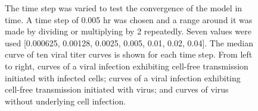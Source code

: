 \begin{figure}
    \centering
    \parbox{\textwidth}{

    \vspace{0.5em}
    \centering
        }


\caption{The time step was varied to test the convergence of the model in time. A time step of 0.005 hr was chosen and a range around it was made by dividing or multiplying by 2 repeatedly. Seven values were used [0.000625, 0.00128, 0.0025, 0.005, 0.01, 0.02, 0.04]. The median curve of ten viral titer curves is shown for each time step. From left to right, curves of a viral infection exhibiting cell-free transmission initiated with infected cells; curves of a viral infection exhibiting cell-free transmission initiated with virus; and curves of virus without underlying cell infection. \label{fig:ViralTiterCurves}}
\end{figure}


